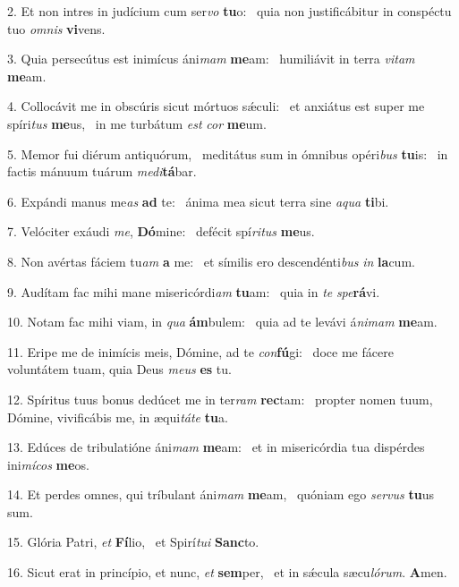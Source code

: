 2. Et non intres in judícium cum ser\textit{vo} \textbf{tu}o: \ast\  quia non justificábitur in conspéctu tuo \textit{om}\textit{nis} \textbf{vi}vens.\

3. Quia persecútus est inimícus áni\textit{mam} \textbf{me}am: \ast\  humiliávit in terra \textit{vi}\textit{tam} \textbf{me}am.\

4. Collocávit me in obscúris sicut mórtuos sǽculi: \dag\  et anxiátus est super me spíri\textit{tus} \textbf{me}us, \ast\  in me turbátum \textit{est} \textit{cor} \textbf{me}um.\

5. Memor fui diérum antiquórum, \dag\  meditátus sum in ómnibus opéri\textit{bus} \textbf{tu}is: \ast\  in factis mánuum tuárum \textit{me}\textit{di}\textbf{tá}bar.\

6. Expándi manus me\textit{as} \textbf{ad} te: \ast\  ánima mea sicut terra sine \textit{a}\textit{qua} \textbf{ti}bi.\

7. Velóciter exáudi \textit{me}, \textbf{Dó}mine: \ast\  defécit spí\textit{ri}\textit{tus} \textbf{me}us.\

8. Non avértas fáciem tu\textit{am} \textbf{a} me: \ast\  et símilis ero descendénti\textit{bus} \textit{in} \textbf{la}cum.\

9. Audítam fac mihi mane misericórdi\textit{am} \textbf{tu}am: \ast\  quia in \textit{te} \textit{spe}\textbf{rá}vi.\

10. Notam fac mihi viam, in \textit{qua} \textbf{ám}bulem: \ast\  quia ad te levávi á\textit{ni}\textit{mam} \textbf{me}am.\

11. Eripe me de inimícis meis, Dómine, ad te \textit{con}\textbf{fú}gi: \ast\  doce me fácere voluntátem tuam, quia Deus \textit{me}\textit{us} \textbf{es} tu.\

12. Spíritus tuus bonus dedúcet me in ter\textit{ram} \textbf{rec}tam: \ast\  propter nomen tuum, Dómine, vivificábis me, in æqui\textit{tá}\textit{te} \textbf{tu}a.\

13. Edúces de tribulatióne áni\textit{mam} \textbf{me}am: \ast\  et in misericórdia tua dispérdes ini\textit{mí}\textit{cos} \textbf{me}os.\

14. Et perdes omnes, qui tríbulant áni\textit{mam} \textbf{me}am, \ast\  quóniam ego \textit{ser}\textit{vus} \textbf{tu}us sum.\

15. Glória Patri, \textit{et} \textbf{Fí}lio, \ast\  et Spirí\textit{tu}\textit{i} \textbf{Sanc}to.\

16. Sicut erat in princípio, et nunc, \textit{et} \textbf{sem}per, \ast\  et in sǽcula sæcu\textit{ló}\textit{rum}. \textbf{A}men.\

